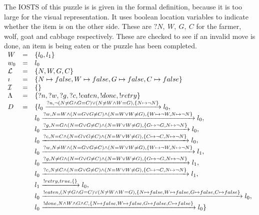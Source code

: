 The IOSTS of this puzzle is is given in the formal definition, because it is too large for the visual representation. It uses boolean location variables to indicate whether the item is on the other side. These are $?N,\:W,\:G,\:C$ for the farmer, wolf, goat and cabbage respectively. These are checked to see if an invalid move is done, an item is being eaten or the puzzle has been completed.
\vspace{5px} \\
$\begin{array}{lcl}
W & = & \{l_0, l_1\} \\
w_0 & = & l_0 \\
\mathcal{L} & = & \{N,W,G,C\} \\
\imath & = & \{N \mapsto false, W \mapsto false, G \mapsto false, C \mapsto false\} \\
\mathcal{I} & = & \{\} \\
\Lambda & = & \{?n, ?w, ?g, ?c, !eaten, !done, !retry\} \\
D & = & \{l_0\xrightarrow{?n, \neg(N \neq G \land G=C)\lor(N \neq W \land W=G), \{N \mapsto \neg N\}}l_0, \\
& & l_0\xrightarrow{?w, N=W \land (N = G \lor G\neq C)\land (N = W \lor W\neq G), \{W \mapsto \neg W, N \mapsto \neg N\}}l_0,\\
& & l_0\xrightarrow{?g, N=G \land (N = G \lor G\neq C)\land (N = W \lor W\neq G), \{G \mapsto \neg G, N \mapsto \neg N\}}l_0,\\
& & l_0\xrightarrow{?c, N=C \land (N = G \lor G\neq C)\land (N = W \lor W\neq G), \{C \mapsto \neg C, N \mapsto \neg N\}}l_0,\\
& & l_0\xrightarrow{?w, N\neq W \land (N = G \lor G\neq C)\land (N = W \lor W\neq G), \{W \mapsto \neg W, N \mapsto \neg N\}}l_1,\\
& & l_0\xrightarrow{?g, N\neq G \land (N = G \lor G\neq C)\land (N = W \lor W\neq G), \{G \mapsto \neg G, N \mapsto \neg N\}}l_1,\\
& & l_0\xrightarrow{?c, N\neq C \land (N = G \lor G\neq C)\land (N = W \lor W\neq G), \{C \mapsto \neg C, N \mapsto \neg N\}}l_1,\\
& & l_1\xrightarrow{!retry,true,\{\}}l_0,\\
& & l_0\xrightarrow{!eaten, (N \neq G \land G=C)\lor(N \neq W \land W=G), \{N \mapsto false, W \mapsto false, G \mapsto false, C \mapsto false\}}l_0, \\
& & l_0\xrightarrow{!done, N \land W \land G \land C, \{N \mapsto false, W \mapsto false, G \mapsto false, C \mapsto false\}}l_0\}
\end{array}$

